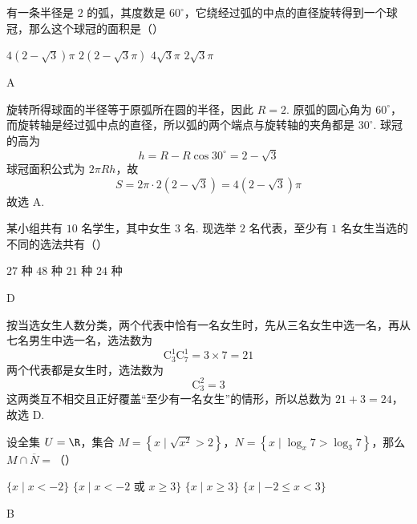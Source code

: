 \documentclass[UTF8,a4paper,oneside,11pt]{ctexbook}
\begin{document}
\begin{problem}
有一条半径是 \(2\) 的弧，其度数是 \(60^\circ\)，它绕经过弧的中点的直径旋转得到一个球冠，那么这个球冠的面积是（\quad）

\choices
    {\(4(2-\sqrt{3})\pi\)}
    {\(2(2-\sqrt{3}\pi)\)}
    {\(4\sqrt{3}\pi\)}
    {\(2\sqrt{3}\pi\)}
\end{problem}

\begin{answer}
A
\end{answer}

\begin{solution}
旋转所得球面的半径等于原弧所在圆的半径，因此 \(R=2\). 原弧的圆心角为 \(60^\circ\)，而旋转轴是经过弧中点的直径，所以弧的两个端点与旋转轴的夹角都是 \(30^\circ\). 球冠的高为
\[
h=R-R\cos30^\circ=2-\sqrt{3}
\]
球冠面积公式为 \(2\pi Rh\)，故
\[
S=2\pi\cdot2(2-\sqrt3)=4(2-\sqrt3)\pi
\]
故选 A.
\end{solution}

\begin{problem}
某小组共有 \(10\) 名学生，其中女生 \(3\) 名. 现选举 \(2\) 名代表，至少有 \(1\) 名女生当选的不同的选法共有（\quad）

\choices
    {\(27\) 种}
    {\(48\) 种}
    {\(21\) 种}
    {\(24\) 种}
\end{problem}

\begin{answer}
D
\end{answer}

\begin{solution}
按当选女生人数分类，两个代表中恰有一名女生时，先从三名女生中选一名，再从七名男生中选一名，选法数为
\[
\mathrm C_3^1\mathrm C_7^1=3\times7=21
\]
两个代表都是女生时，选法数为
\[
\mathrm C_3^2=3
\]
这两类互不相交且正好覆盖“至少有一名女生”的情形，所以总数为 \(21+3=24\)，故选 D.
\end{solution}

\begin{problem}
设全集 \(U=\R\)，集合 \(M=\left\{x\mid \sqrt{x^2}>2\right\}\)，\(N=\left\{x\mid \log_x 7>\log_3 7\right\}\)，那么 \(M\cap\overline{N}=\)（\quad）

\choices
    {\(\{x\mid x<-2\}\)}
    {\(\{x\mid x<-2\text{\ 或\ }x\geqslant 3\}\)}
    {\(\{x\mid x\geqslant 3\}\)}
    {\(\{x\mid -2\leqslant x<3\}\)}
\end{problem}

\begin{answer}
B
\end{answer}
\end{document}
